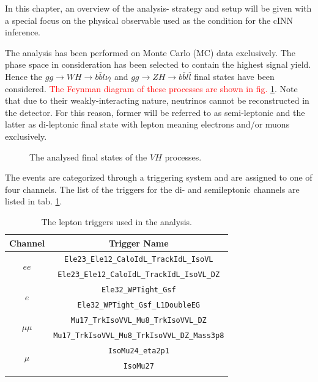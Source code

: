 \label{ch:analysis_strategy}

In this chapter, an overview of the analysis- strategy and setup will be given with a special focus on the physical observable used as the condition for the cINN inference.


The analysis has been performed on Monte Carlo (MC) data exclusively. The phase space in consideration has been selected to contain the highest signal yield. Hence the $gg \rightarrow WH \rightarrow b\bar{b} l\nu_l$ and $gg \rightarrow ZH \rightarrow b\bar{b}l\bar{l}$ final states have been considered. \textcolor{red}{The Feynman diagram of these processes are shown in fig. \ref{fig:VH_finalstates}}. Note that due to their weakly-interacting nature, neutrinos cannot be reconstructed in the detector. For this reason, former will be referred to as semi-leptonic and the latter as di-leptonic final state with lepton meaning electrons and/or muons exclusively.

\begin{figure}[h!]
	\centering
	\caption{The analysed final states of the $VH$ processes.}
	\label{fig:VH_finalstates}
\end{figure}

The events are categorized through a triggering system and are assigned to one of four channels. The list of the triggers for the di- and semileptonic channels are listed in tab. \ref{tab:triggers}.

\begin{table}[h!]
	\centering
	\begin{tabular}{cc}
		Channel & Trigger Name \\
		\hline 
		\multirow{2}{*}{$ee$} & \texttt{Ele23\_Ele12\_CaloIdL\_TrackIdL\_IsoVL} \\
		& \texttt{Ele23\_Ele12\_CaloIdL\_TrackIdL\_IsoVL\_DZ} \\
		\hline 
		\multirow{2}{*}{$e$} & \texttt{Ele32\_WPTight\_Gsf} \\
		& \texttt{Ele32\_WPTight\_Gsf\_L1DoubleEG} \\
		\hline 
		\multirow{2}{*}{$\mu\mu$} & \texttt{Mu17\_TrkIsoVVL\_Mu8\_TrkIsoVVL\_DZ} \\
		& \texttt{Mu17\_TrkIsoVVL\_Mu8\_TrkIsoVVL\_DZ\_Mass3p8} \\
		\hline 
		\multirow{2}{*}{$\mu$} & \texttt{IsoMu24\_eta2p1} \\
		& \texttt{IsoMu27} \\
		\hline \\
	\end{tabular}
	\caption{The lepton triggers used in the analysis.}
	\label{tab:triggers}
\end{table}

